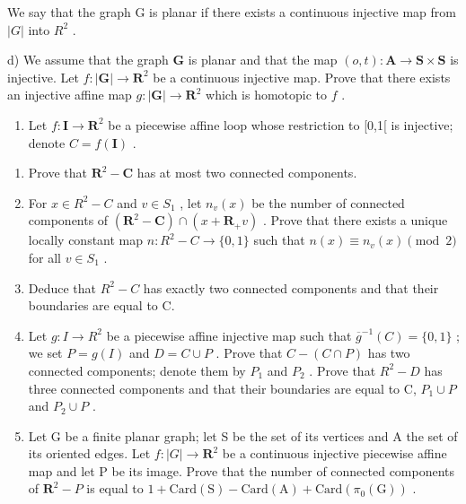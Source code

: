 We say that the graph G is planar if there exists a continuous injective map from \(|G|\) into \(R^{2}\) .

d) We assume that the graph \(\mathbf{G}\) is planar and that the map \((o,t)\colon\mathbf{A}\to\mathbf{S}\times\mathbf{S}\) is injective. Let \(f\colon|\mathbf{G}|\to\mathbf{R}^{2}\) be a continuous injective map. Prove that there exists an injective affine map \(g\colon|\mathbf{G}|\to\mathbf{R}^{2}\) which is homotopic to \(f\) .

\begin{enumerate}
\def\labelenumi{\arabic{enumi})}
\setcounter{enumi}{19}
\tightlist
\item
   Let \(f \colon \mathbf{I} \to \mathbf{R}^2\) be a piecewise affine loop whose restriction to [0,1[ is injective; denote \(C = f(\mathbf{I})\) .
\end{enumerate}

\begin{enumerate}
\def\labelenumi{\alph{enumi})}
\item
   Prove that \(\mathbf{R}^2 -\mathbf{C}\) has at most two connected components.
\item
   For \(x \in R^{2} - C\) and \(v \in S_{1}\) , let \(n_{v}(x)\) be the number of connected components of \((\mathbf{R}^{2} - \mathbf{C}) \cap (x + \mathbf{R}_{+}v)\) . Prove that there exists a unique locally constant map \(n: R^{2} - C \to \{0,1\}\) such that \(n(x) \equiv n_{v}(x) \pmod{2}\) for all \(v \in S_{1}\) .
\item
  Deduce that \(R^{2}-C\) has exactly two connected components and that their boundaries are equal to C.
\item
   Let \(g: I \to R^{2}\) be a piecewise affine injective map such that \(\overline{g}^{-1}(C) = \{0,1\}\) ; we set \(P = g(I)\) and \(D = C \cup P\) . Prove that \(C - (C \cap P)\) has two connected components; denote them by \(P_{1}\) and \(P_{2}\) . Prove that \(R^{2} - D\) has three connected components and that their boundaries are equal to C, \(P_{1} \cup P\) and \(P_{2} \cup P\) .
\item
   Let G be a finite planar graph; let S be the set of its vertices and A the set of its oriented edges. Let \(f\colon|G|\to\mathbf{R}^{2}\) be a continuous injective piecewise affine map and let P be its image. Prove that the number of connected components of \(\mathbf{R}^{2}-P\) is equal to \(1+\mathrm{Card(S)}-\mathrm{Card(A)}+\mathrm{Card}(\pi_{0}(\mathrm{G}))\) .
\end{enumerate}

